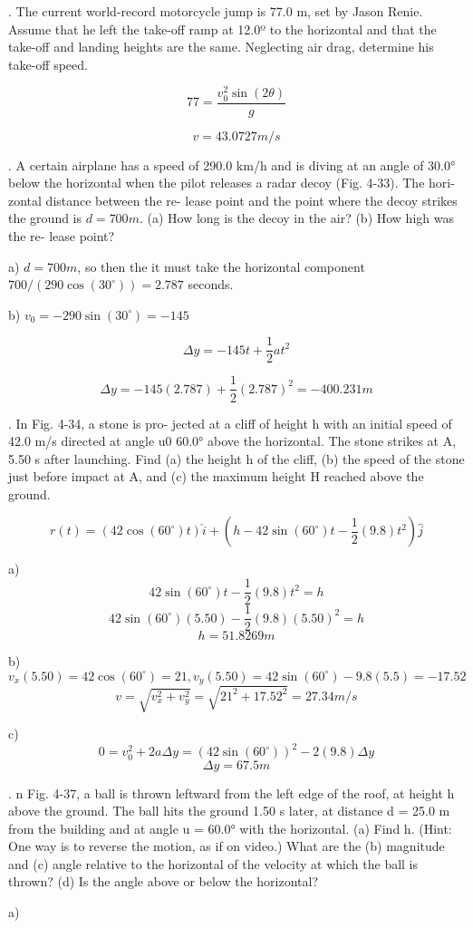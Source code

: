 \documentclass{scrreprt} %
\begin{document}
. The current world-record motorcycle jump is 77.0 m,
set  by  Jason  Renie. Assume  that he  left  the  take-off  ramp  at  
12.0º to the horizontal and that the take-off and landing 
heights are the same. Neglecting air drag, determine his take-off
speed.

$$77=\frac{v_0^2\sin(2\theta)}{g}$$

$$\boxed{v = 43.0727 m/s}$$

. A certain airplane has a
speed  of  290.0 km/h  and  is  diving
at  an  angle  of 30.0° below  the
horizontal  when  the pilot  releases
a radar decoy (Fig. 4-33). The hori-
zontal distance between the re-
lease  point  and  the  point  where
the decoy strikes the ground is $d =
700 m$. (a) How long is the decoy in
the  air?  (b)  How  high  was  the  re-
lease point?

a) $d = 700m$, so then the it must take the horizontal component
$700/(290\cos(30^\circ))=\boxed{2.787}$ seconds.

b) $v_0 = -290\sin(30^\circ) = -145$

$$\Delta y = -145t + \frac{1}{2}at^2$$

$$\Delta y = -145(2.787) + \frac{1}{2}(2.787)^2 = \boxed{-400.231 m}$$

. In Fig. 4-34, a stone is pro-
jected at a cliff of height h with an initial speed of 42.0 m/s directed
at  angle  u0 60.0° above  the  horizontal. The  stone  strikes  at  A,
5.50 s  after  launching. Find  (a)  the  height  h of  the  cliff, (b)  the
speed of the stone just before impact at A, and (c) the maximum
height H reached above the ground.

$$r(t) = (42\cos(60^\circ)t)\hat{i} + (h - 42\sin(60^\circ)t - \frac{1}{2}(9.8)t^2)\hat{j}$$

a)  $$42\sin(60^\circ)t - \frac{1}{2}(9.8)t^2 = h$$
	$$42\sin(60^\circ)(5.50) - \frac{1}{2}(9.8)(5.50)^2 = h$$
	$$\boxed{h = 51.8269 m}$$

b) 	$$v_x(5.50) = 42\cos(60^\circ) = 21, v_y(5.50) = 42\sin(60^\circ) - 9.8(5.5) = -17.52$$
	$$v = \sqrt{v_x^2 + v_y^2} = \sqrt{21^2 + 17.52^2} = \boxed{27.34 m/s}$$

c) 	$$0 = v_0^2 + 2a\Delta y = (42\sin(60^\circ))^2 - 2(9.8)\Delta y$$
	$$\boxed{\Delta y = 67.5m}$$

. n Fig. 4-37, a ball is thrown leftward from the left edge of the
roof, at  height  h above  the  ground. The  ball  hits  the  ground  1.50 s
later, at distance d = 25.0 m from the building and at angle u = 60.0°
with  the  horizontal. (a)  Find  h.
(Hint: One way is to reverse the
motion, as  if  on  video.)  What
are  the  (b)  magnitude  and  (c)
angle  relative  to  the  horizontal
of the velocity at which the ball
is thrown? (d) Is the angle
above or below the horizontal?

a) 
\end{document}
